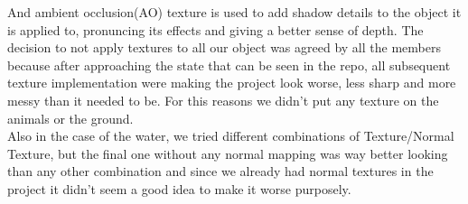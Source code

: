 \documentclass[a4paper, 11pt]{article}
\begin{document}
And ambient occlusion(AO) texture is used to add shadow details to the object it is applied to, pronuncing its effects and giving a better sense of depth.
The decision to not apply textures to all our object was agreed by all the members because after approaching the state that can be seen in the repo, all subsequent texture implementation were making the project look worse, less sharp and more messy than it needed to be. For this reasons we didn't put any texture on the animals or the ground.\\
Also in the case of the water, we tried different combinations of Texture/Normal Texture, but the final one without any normal mapping was way better looking than any other combination and since we already had normal textures in the project it didn't seem a good idea to make it worse purposely.\\
\end{document}
